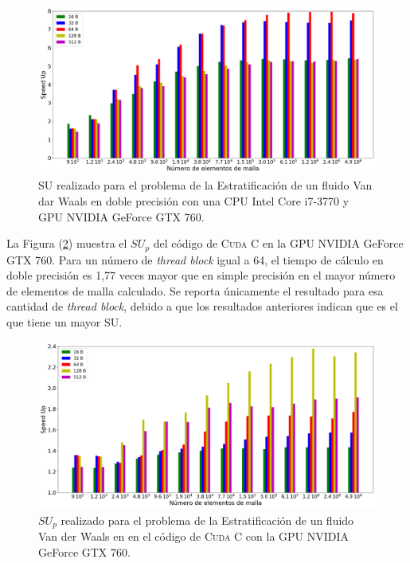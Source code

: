 \begin{figure}[htbp]
	\centering
	\includegraphics[width=\textwidth]{figs_2/cap4/s_760_VdW_double_10}
	\caption{SU realizado para el problema de la Estratificación de un fluido Van dar Waals en doble precisión con una CPU Intel Core i7-3770 y GPU NVIDIA GeForce GTX 760.} 
	\label{fig:s_760_VdW_double_10}	
\end{figure}

La Figura (\ref{fig:c_760_VdW_cuda_10}) muestra el ${SU}_p$ del código de \textsc{Cuda C} en la GPU NVIDIA GeForce GTX 760. Para un número de \textit{thread block} igual a 64, el tiempo de cálculo en doble precisión es 1,77 veces mayor que en simple precisión en el mayor número de elementos de malla calculado. Se reporta únicamente el resultado para esa cantidad de \textit{thread block}, debido a que los resultados anteriores indican que es el que tiene un mayor SU.

\begin{figure}[H]
	\centering
	\includegraphics[width=\textwidth]{figs_2/cap4/c_760_VdW_cuda_10}
	\caption{$SU_p$ realizado para el problema de la Estratificación de un fluido Van der Waals en en el código de \textsc{Cuda C} con la GPU NVIDIA GeForce GTX 760.} 
	\label{fig:c_760_VdW_cuda_10}	
\end{figure}

